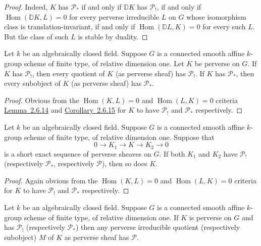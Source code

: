 \begin{proof}
Indeed, \(K\) has \(\mathcal{P}_*\) if and only if \(\mathbb{D}K\) has
\(\mathcal{P}_!\), if and only if
\(\operatorname{Hom}(\mathbb{D}K,L)=0\) for every perverse irreducible \(L\) on
\(G\) whose isomorphism class is translation-invariant, if and only if
\(\operatorname{Hom}(\mathbb{D}L,K)=0\) for every such \(L\). But the class of
such \(L\) is stable by duality.
\end{proof}

Let \(k\) be an algebraically closed field. Suppose \(G\) is a connected smooth
affine \(k\)-group scheme of finite type, of relative dimension one. Let \(K\)
be perverse on \(G\). If \(K\) has \(\mathcal{P}_!\), then every quotient of
\(K\) (as perverse sheaf) has \(\mathcal{P}_!\). If \(K\) has
\(\mathcal{P}_*\), then every subobject of \(K\) (as perverse sheaf) has
\(\mathcal{P}_*\).

\begin{proof}
Obvious from the \(\operatorname{Hom}(K,L)=0\) and
\(\operatorname{Hom}(L,K)=0\) criteria \hyperref[lem:2.6.14]{Lemma~2.6.14} and \hyperref[cor:2.6.15]{Corollary~2.6.15} for \(K\) to have
\(\mathcal{P}_!\) and \(\mathcal{P}_*\) respectively.
\end{proof}

Let \(k\) be an algebraically closed field. Suppose \(G\) is a connected smooth
affine \(k\)-group scheme of finite type, of relative dimension one. Suppose
that
\[
  0\to K_1\to K\to K_2\to0
\]
is a short exact sequence of perverse sheaves on \(G\). If both \(K_1\) and
\(K_2\) have \(\mathcal{P}_!\) (respectively \(\mathcal{P}_*\), respectively
\(\mathcal{P}\)), then so does \(K\).

\begin{proof}
Again obvious from the \(\operatorname{Hom}(K,L)=0\) and
\(\operatorname{Hom}(L,K)=0\) criteria for \(K\) to have \(\mathcal{P}_!\) and
\(\mathcal{P}_*\) respectively.
\end{proof}

Let \(k\) be an algebraically closed field. Suppose \(G\) is a connected smooth
affine \(k\)-group scheme of finite type, of relative dimension one. If \(K\)
is perverse on \(G\) and has \(\mathcal{P}_!\) (respectively
\(\mathcal{P}_*\)) then any perverse irreducible quotient (respectively
subobject) \(M\) of \(K\) as perverse sheaf has \(\mathcal{P}\).

